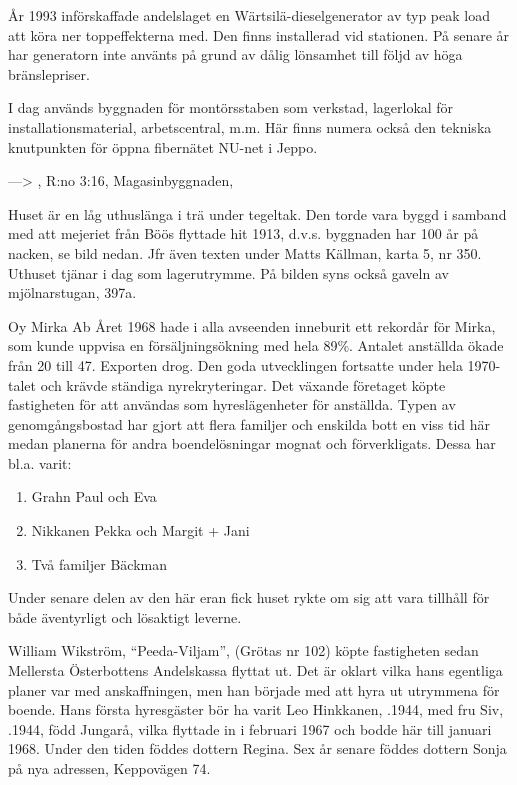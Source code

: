 År 1993 införskaffade andelslaget en Wärtsilä-dieselgenerator av typ peak load att köra ner toppeffekterna med. Den finns installerad vid 	stationen. På senare år har generatorn inte använts på grund av dålig lönsamhet till följd av höga bränslepriser.

I dag används byggnaden för montörsstaben som verkstad, lagerlokal för installationsmaterial, arbetscentral, m.m. Här finns numera också den tekniska knutpunkten för öppna fibernätet NU-net i Jeppo.


---> , R:no 3:16, 	Magasinbyggnaden, 

Huset är en låg uthuslänga i trä under tegeltak. Den torde vara byggd i samband med att mejeriet från Böös flyttade hit 1913, d.v.s. byggnaden har 100 år på nacken, se bild nedan. Jfr även texten under Matts Källman, karta 5, nr 350. Uthuset tjänar i dag som lagerutrymme. På bilden syns också gaveln av mjölnarstugan, 397a.



%
Oy Mirka Ab	Året 1968 hade i alla avseenden inneburit ett rekordår för Mirka, som kunde uppvisa en försäljningsökning med hela 89\%. Antalet anställda ökade från 20 till 47. Exporten drog. Den goda utvecklingen fortsatte under hela 1970-talet och krävde ständiga nyrekryteringar. Det växande företaget köpte fastigheten för att användas som hyreslägenheter för anställda. Typen av genomgångsbostad har gjort att flera familjer och enskilda bott en viss tid här medan planerna för andra boendelösningar mognat och förverkligats. Dessa har bl.a. varit:
\begin{enumerate}
  \item Grahn Paul och Eva
  \item Nikkanen Pekka och Margit + Jani
  \item Två familjer Bäckman
\end{enumerate}
Under senare delen av den här eran fick huset rykte om sig att vara tillhåll för både äventyrligt och lösaktigt leverne.


%
William Wikström, ``Peeda-Viljam'', (Grötas nr 102) köpte fastigheten sedan Mellersta Österbottens Andelskassa flyttat ut. Det är oklart vilka hans egentliga planer var med anskaffningen, men han började med att hyra ut utrymmena för boende. Hans första hyresgäster bör ha varit Leo Hinkkanen, .1944, med fru Siv, .1944, född Jungarå, vilka flyttade in i februari 1967 och bodde här till januari 1968. Under den tiden föddes dottern Regina. Sex år senare föddes dottern Sonja på nya adressen, Keppovägen 74.

